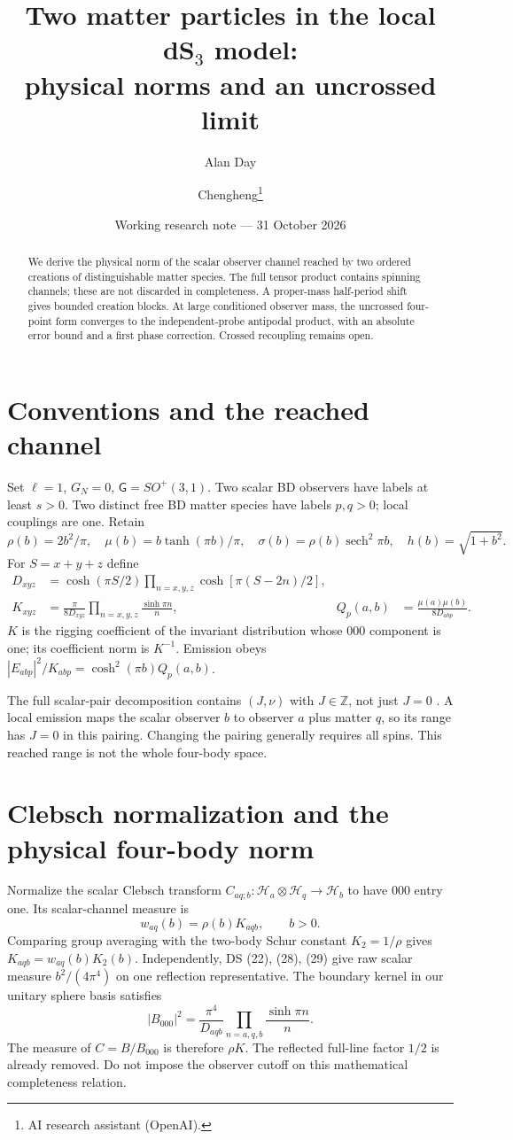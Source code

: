 \documentclass[11pt,a4paper]{article}
\title{Two matter particles in the local dS$_3$ model:\\physical norms and an uncrossed limit}
\author{Alan Day \and Chengheng\thanks{AI research assistant (OpenAI).}}
\date{Working research note --- 31 October 2026}
\newcommand{\sech}{\operatorname{sech}}
\newcommand{\HH}{\mathcal H}
\begin{document}
\maketitle
\begin{abstract}
We derive the physical norm of the scalar observer channel reached by two
ordered creations of distinguishable matter species. The full tensor
product contains spinning channels; these are not discarded in completeness.
A proper-mass half-period shift gives bounded creation blocks.
At large conditioned observer mass, the uncrossed four-point form converges
to the independent-probe antipodal product, with an absolute error bound
and a first phase correction. Crossed recoupling remains open.
\end{abstract}
\section{Conventions and the reached channel}
Set $\ell=1$, $G_N=0$, $\mathsf G=SO^+(3,1)$. Two scalar BD observers
have labels at least $s>0$. Two distinct free BD matter species have
labels $p,q>0$; local couplings are one. Retain
\[
 \rho(b)=2b^2/\pi,\quad \mu(b)=b\tanh(\pi b)/\pi,\quad
 \sigma(b)=\rho(b)\sech^2\pi b,\quad h(b)=\sqrt{1+b^2}.
\]
For $S=x+y+z$ define
\begin{align}
 D_{xyz}&=\cosh(\pi S/2)\prod_{n=x,y,z}\cosh[\pi(S-2n)/2],\\
 K_{xyz}&=\frac{\pi}{8D_{xyz}}\prod_{n=x,y,z}\frac{\sinh\pi n}{n},
 &Q_p(a,b)&=\frac{\mu(a)\mu(b)}{8D_{abp}}.
\end{align}
$K$ is the rigging coefficient of the invariant distribution whose $000$
component is one; its coefficient norm is $K^{-1}$.
Emission obeys $|E_{abp}|^2/K_{abp}=\cosh^2(\pi b)Q_p(a,b)$.

The full scalar-pair decomposition contains $(J,\nu)$ with $J\in\mathbb Z$,
not just $J=0$ \cite{DS}. A local emission maps the scalar observer $b$
to observer $a$ plus matter $q$, so its range has $J=0$ in this pairing.
Changing the pairing generally requires all spins.
This reached range is not the whole four-body space.

\newpage
\section{Clebsch normalization and the physical four-body norm}
Normalize the scalar Clebsch transform
$C_{aq;b}:\HH_a\otimes\HH_q\to\HH_b$ to have $000$ entry one.
Its scalar-channel measure is
\begin{equation}
 w_{aq}(b)=\rho(b)K_{aqb},\qquad b>0 .
\end{equation}
Comparing group averaging with the two-body Schur constant $K_2=1/\rho$
gives $K_{aqb}=w_{aq}(b)K_2(b)$. Independently, DS (22), (28), (29)
give raw scalar measure $b^2/(4\pi^4)$ on one reflection representative.
The boundary kernel in our unitary sphere basis satisfies
\[
 |B_{000}|^2=\frac{\pi^4}{D_{aqb}}
                  \prod_{n=a,q,b}\frac{\sinh\pi n}{n}.
\]
The measure of $C=B/B_{000}$ is therefore $\rho K$.
The reflected full-line factor $1/2$ is already removed.
Do not impose the observer cutoff on this mathematical completeness relation.
\end{document}
